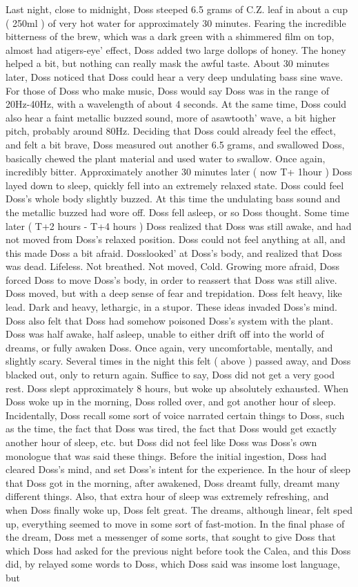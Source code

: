 \documentclass[12pt]{book}
\begin{document}
Last night, close to midnight, Doss steeped 6.5 grams of C.Z. leaf in about a cup ( 250ml ) of very hot water for approximately 30 minutes. Fearing the incredible bitterness of the brew, which was a dark green with a shimmered film on top, almost had atigers-eye' effect, Doss added two large dollops of honey. The honey helped a bit, but nothing can really mask the awful taste. About 30 minutes later, Doss noticed that Doss could hear a very deep undulating bass sine wave. For those of Doss who make music, Doss would say Doss was in the range of 20Hz-40Hz, with a wavelength of about 4 seconds. At the same time, Doss could also hear a faint metallic buzzed sound, more of asawtooth' wave, a bit higher pitch, probably around 80Hz. Deciding that Doss could already feel the effect, and felt a bit brave, Doss measured out another 6.5 grams, and swallowed Doss, basically chewed the plant material and used water to swallow. Once again, incredibly bitter. Approximately another 30 minutes later ( now T+ 1hour ) Doss layed down to sleep, quickly fell into an extremely relaxed state. Doss could feel Doss's whole body slightly buzzed. At this time the undulating bass sound and the metallic buzzed had wore off. Doss fell asleep, or so Doss thought. Some time later ( T+2 hours - T+4 hours ) Doss realized that Doss was still awake, and had not moved from Doss's relaxed position. Doss could not feel anything at all, and this made Doss a bit afraid. Dosslooked' at Doss's body, and realized that Doss was dead. Lifeless. Not breathed. Not moved, Cold. Growing more afraid, Doss forced Doss to move Doss's body, in order to reassert that Doss was still alive. Doss moved, but with a deep sense of fear and trepidation. Doss felt heavy, like lead. Dark and heavy, lethargic, in a stupor. These ideas invaded Doss's mind. Doss also felt that Doss had somehow poisoned Doss's system with the plant. Doss was half awake, half asleep, unable to either drift off into the world of dreams, or fully awaken Doss. Once again, very uncomfortable, mentally, and slightly scary. Several times in the night this felt ( above ) passed away, and Doss blacked out, only to return again. Suffice to say, Doss did not get a very good rest. Doss slept approximately 8 hours, but woke up absolutely exhausted. When Doss woke up in the morning, Doss rolled over, and got another hour of sleep. Incidentally, Doss recall some sort of voice narrated certain things to Doss, such as the time, the fact that Doss was tired, the fact that Doss would get exactly another hour of sleep, etc. but Doss did not feel like Doss was Doss's own monologue that was said these things. Before the initial ingestion, Doss had cleared Doss's mind, and set Doss's intent for the experience. In the hour of sleep that Doss got in the morning, after awakened, Doss dreamt fully, dreamt many different things. Also, that extra hour of sleep was extremely refreshing, and when Doss finally woke up, Doss felt great. The dreams, although linear, felt sped up, everything seemed to move in some sort of fast-motion. In the final phase of the dream, Doss met a messenger of some sorts, that sought to give Doss that which Doss had asked for the previous night before took the Calea, and this Doss did, by relayed some words to Doss, which Doss said was insome lost language, but 
\end{document}
